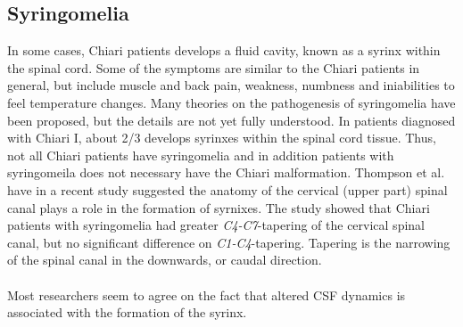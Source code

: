 \subsection{Syringomelia}
In some cases, Chiari patients develops a fluid cavity, known as a syrinx within the spinal cord. Some of the symptoms are similar to the Chiari patients in general, but include muscle and back pain, weakness, numbness and iniabilities to feel temperature changes. Many theories on the pathogenesis of syringomelia have been proposed, but the details are not yet fully understood. In patients diagnosed with Chiari I, about 2/3 develops syrinxes within the spinal cord tissue. Thus, not all Chiari patients have syringomelia and in addition patients with syringomeila does not necessary have the Chiari malformation. Thompson et al. have in a recent study suggested the anatomy of the cervical (upper part) spinal canal plays a role in the formation of syrnixes. \cite{Thom15} The study showed that Chiari patients with syringomelia had greater \textit{C4-C7}-tapering of the cervical spinal canal, but no significant difference on \textit{C1-C4}-tapering. Tapering is the narrowing of the spinal canal in the downwards, or caudal direction. 
\\
\\
Most researchers seem to agree on the fact that altered CSF dynamics is associated with the formation of the syrinx. 
